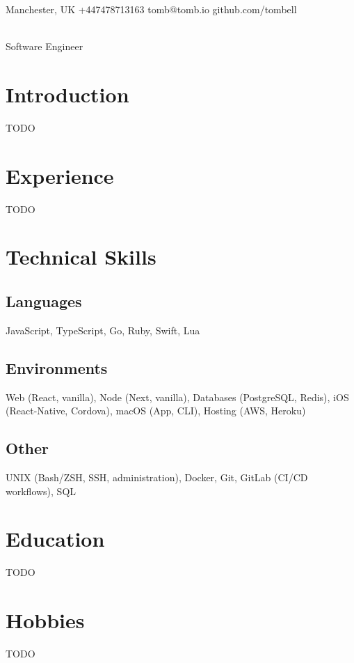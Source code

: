 \documentclass[11pt,a4paper]{article}
\renewcommand{\maketitle}{
  \begin{center}
    {\huge\bfseries\theauthor} \\
    \normalsize Software Engineer
  \end{center}
}
\begin{document}
  \begin{center}
    \small
    \raisebox{-0.1\height}{\small\faMapMarker} Manchester, UK
    \hspace{1cm}
    \raisebox{-0.1\height}{\small\faMobile} +447478713163
    \hspace{1cm}
    \raisebox{-0.1\height}{\small\faAt} tomb@tomb.io
    \hspace{1cm}
    \raisebox{-0.1\height}{\small\faGithubAlt} github.com/tombell
  \end{center}

  \author{Tom Bell}
  \maketitle

  \section{Introduction}
  \small{TODO}

  \section{Experience}
  \small{TODO}

  \section{Technical Skills}
  \subsection{Languages}
  \small{JavaScript, TypeScript, Go, Ruby, Swift, Lua}
  \subsection{Environments}
  \small{Web (React, vanilla), Node (Next, vanilla), Databases (PostgreSQL, Redis), iOS (React-Native, Cordova), macOS (App, CLI), Hosting (AWS, Heroku)}
  \subsection{Other}
  \small{UNIX (Bash/ZSH, SSH, administration), Docker, Git, GitLab (CI/CD workflows), SQL}

  \section{Education}
  \small TODO

  \section{Hobbies}
  \small TODO
\end{document}
